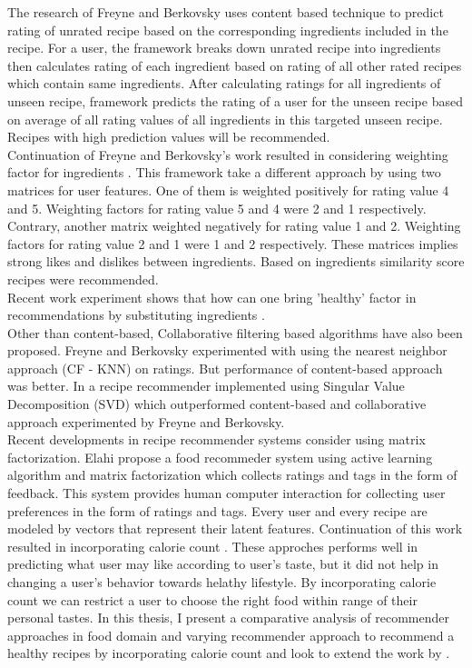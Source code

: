 \noindent The research of Freyne and Berkovsky \cite{13} uses content based technique to predict rating of unrated recipe based on the corresponding ingredients included in the recipe. For a user, the framework breaks down unrated recipe into ingredients then calculates rating of each ingredient based on rating of all other rated recipes which contain same ingredients. After calculating ratings for all ingredients of unseen recipe, framework predicts the rating of a user for the unseen recipe based on average of all rating values of all ingredients in this targeted unseen recipe. Recipes with high prediction values will be recommended.
\\

\noindent Continuation of Freyne and Berkovsky's \cite{13} work resulted in considering weighting factor for ingredients \cite{15}. This framework take a different approach by using two matrices for user features. One of them is weighted positively for rating value 4 and 5. Weighting factors for rating value 5 and 4 were 2 and 1 respectively. Contrary, another matrix weighted negatively for rating value 1 and 2. Weighting factors for rating value 2 and 1 were 1 and 2 respectively. These matrices implies strong likes and dislikes between ingredients. Based on ingredients similarity score recipes were recommended.
\\

\noindent Recent work experiment shows that how can one bring 'healthy' factor in recommendations by substituting ingredients \cite{17}.
\\
   
\noindent Other than content-based, Collaborative filtering based algorithms have also been proposed. Freyne and Berkovsky experimented with using the nearest neighbor approach (CF - KNN) on ratings. But performance of content-based approach was better. In \cite{15} a recipe recommender implemented using Singular Value Decomposition (SVD) which outperformed content-based and collaborative approach experimented by Freyne and Berkovsky.
\\

\noindent Recent developments in recipe recommender systems consider using matrix factorization. Elahi propose a food recommeder system using active learning algorithm and matrix factorization \cite{16} which collects ratings and tags in the form of feedback. This system provides human computer interaction for collecting user preferences in the form of ratings and tags. Every user and every recipe are modeled by vectors that represent their latent features. Continuation of this work resulted in incorporating calorie count \cite{18}. 
These approches performs well in predicting what user may like according to user's taste, but it did not help in changing a user's behavior towards helathy lifestyle. By incorporating calorie count we can restrict a user to choose the right food within range of their personal tastes. In this thesis, I present a   comparative analysis of recommender approaches in food domain and varying recommender approach to recommend a healthy recipes by incorporating calorie count and look to extend the work by \cite{16,18}.